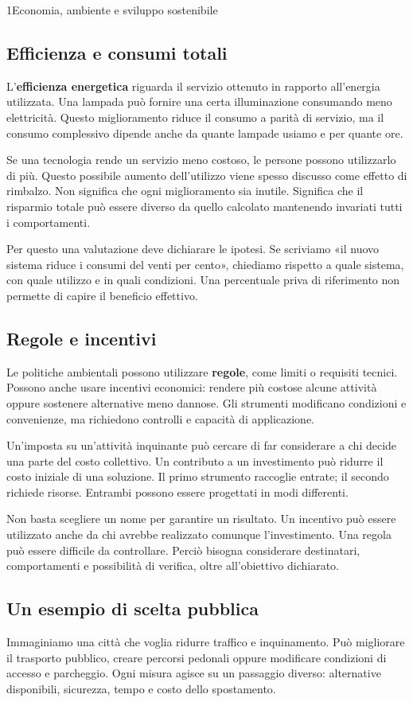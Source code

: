 \begin{lettura}{1}{Economia, ambiente e sviluppo sostenibile}
\subsection*{Efficienza e consumi totali}
L'\textbf{efficienza energetica} riguarda il servizio ottenuto in rapporto all'energia utilizzata. Una lampada può fornire una certa illuminazione consumando meno elettricità. Questo miglioramento riduce il consumo a parità di servizio, ma il consumo complessivo dipende anche da quante lampade usiamo e per quante ore.

Se una tecnologia rende un servizio meno costoso, le persone possono utilizzarlo di più. Questo possibile aumento dell'utilizzo viene spesso discusso come effetto di rimbalzo. Non significa che ogni miglioramento sia inutile. Significa che il risparmio totale può essere diverso da quello calcolato mantenendo invariati tutti i comportamenti.

Per questo una valutazione deve dichiarare le ipotesi. Se scriviamo «il nuovo sistema riduce i consumi del venti per cento», chiediamo rispetto a quale sistema, con quale utilizzo e in quali condizioni. Una percentuale priva di riferimento non permette di capire il beneficio effettivo.

\subsection*{Regole e incentivi}
Le politiche ambientali possono utilizzare \textbf{regole}, come limiti o requisiti tecnici. Possono anche usare incentivi economici: rendere più costose alcune attività oppure sostenere alternative meno dannose. Gli strumenti modificano condizioni e convenienze, ma richiedono controlli e capacità di applicazione.

Un'imposta su un'attività inquinante può cercare di far considerare a chi decide una parte del costo collettivo. Un contributo a un investimento può ridurre il costo iniziale di una soluzione. Il primo strumento raccoglie entrate; il secondo richiede risorse. Entrambi possono essere progettati in modi differenti.

Non basta scegliere un nome per garantire un risultato. Un incentivo può essere utilizzato anche da chi avrebbe realizzato comunque l'investimento. Una regola può essere difficile da controllare. Perciò bisogna considerare destinatari, comportamenti e possibilità di verifica, oltre all'obiettivo dichiarato.

\subsection*{Un esempio di scelta pubblica}
Immaginiamo una città che voglia ridurre traffico e inquinamento. Può migliorare il trasporto pubblico, creare percorsi pedonali oppure modificare condizioni di accesso e parcheggio. Ogni misura agisce su un passaggio diverso: alternative disponibili, sicurezza, tempo e costo dello spostamento.


\end{lettura}
